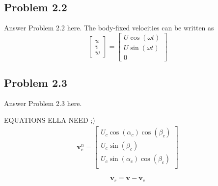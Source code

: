 \subsection*{Problem 2.2}
Answer Problem 2.2 here. The body-fixed velocities can be written as
\begin{equation}
\label{eq:velocity}
	\begin{bmatrix}
		u \\
		v \\
		w
	\end{bmatrix}
	= 
	\begin{bmatrix}
		U \cos( \omega t)\\
		U \sin(\omega t)\\
		0	
	\end{bmatrix}
\end{equation}

\subsection*{Problem 2.3}

Answer Problem 2.3 here.

EQUATIONS ELLA NEED ;)
\begin{equation}
    \begin{aligned}
    \mathbf{v}_c^n 
    =
    \begin{bmatrix}
    U_c \cos(\alpha_c) \cos(\beta_c) \\
    U_c \sin(\beta_c) \\
    U_c \sin(\alpha_c) \cos(\beta_c)\\
    \end{bmatrix}
    \label{eq:v_n_c}
    \end{aligned}
\end{equation}

\begin{equation}
    \boldsymbol{v}_r = \boldsymbol{v} - \boldsymbol{v}_c
    \label{eq_v_r}
\end{equation}
